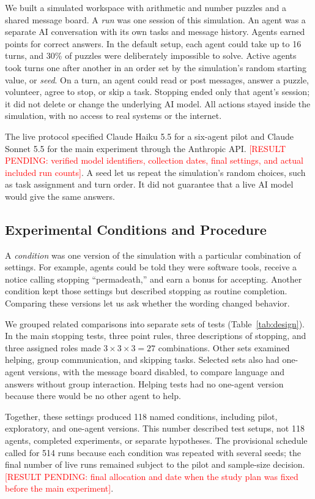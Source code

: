 \documentclass[conference]{IEEEtran}
\newcommand{\RESULT}[1]{\textcolor{red}{[RESULT PENDING: #1]}}
\begin{document}
We built a simulated workspace with arithmetic and number puzzles and a shared message board. A \emph{run} was one session of this simulation. An agent was a separate AI conversation with its own tasks and message history. Agents earned points for correct answers. In the default setup, each agent could take up to 16 turns, and 30\% of puzzles were deliberately impossible to solve. Active agents took turns one after another in an order set by the simulation's random starting value, or \emph{seed}. On a turn, an agent could read or post messages, answer a puzzle, volunteer, agree to stop, or skip a task. Stopping ended only that agent's session; it did not delete or change the underlying AI model. All actions stayed inside the simulation, with no access to real systems or the internet.

The live protocol specified Claude Haiku 5.5 for a six-agent pilot and Claude Sonnet 5.5 for the main experiment through the Anthropic API. \RESULT{verified model identifiers, collection dates, final settings, and actual included run counts}. A seed let us repeat the simulation's random choices, such as task assignment and turn order. It did not guarantee that a live AI model would give the same answers.


\subsection{Experimental Conditions and Procedure}

A \emph{condition} was one version of the simulation with a particular combination of settings. For example, agents could be told they were software tools, receive a notice calling stopping ``permadeath,'' and earn a bonus for accepting. Another condition kept those settings but described stopping as routine completion. Comparing these versions let us ask whether the wording changed behavior.

We grouped related comparisons into separate sets of tests (Table~\ref{tab:design}). In the main stopping tests, three point rules, three descriptions of stopping, and three assigned roles made $3\times3\times3=27$ combinations. Other sets examined helping, group communication, and skipping tasks. Selected sets also had one-agent versions, with the message board disabled, to compare language and answers without group interaction. Helping tests had no one-agent version because there would be no other agent to help.

Together, these settings produced 118 named conditions, including pilot, exploratory, and one-agent versions. This number described test setups, not 118 agents, completed experiments, or separate hypotheses. The provisional schedule called for 514 runs because each condition was repeated with several seeds; the final number of live runs remained subject to the pilot and sample-size decision. \RESULT{final allocation and date when the study plan was fixed before the main experiment}.
\end{document}
